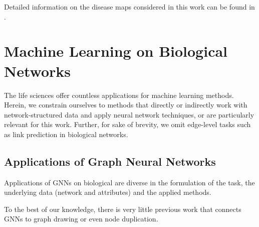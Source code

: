 \documentclass[
	fontsize=10pt, %
	twoside=false, %
	secnumdepth=1, %
]{kaobook}
\begin{document}
\cite{sompairac_metabolic_2019}


Detailed information on
the disease maps considered in this work can be found in .






\section{Machine Learning on Biological Networks}
\label{sec:machine-learning}

The life sciences offer countless applications for machine learning methods.
Herein, we constrain ourselves to methods that directly or indirectly work with
network-structured data and apply neural network techniques, or are particularly
relevant for this work. Further, for sake of brevity, we omit edge-level tasks such as
link prediction in biological networks.



\subsection{Applications of Graph Neural Networks}
\label{sec:gnn-applications}

Applications of GNNs on biological are diverse in the formulation of the task,
the underlying data (network and attributes) and the applied methods.

To the best of our knowledge, there is very little previous work that connects
GNNs to graph drawing or even node duplication. 
\end{document}
